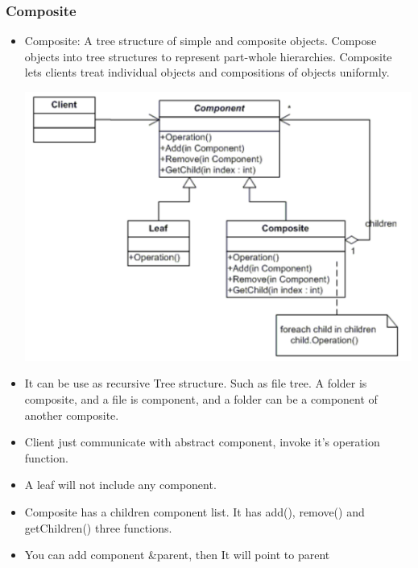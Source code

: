 \documentclass[a4paper,12pt,twoside]{book}
\begin{document}
\subsubsection{Composite}
\begin{itemize}
\item Composite: A tree structure of simple and composite objects. Compose objects into tree structures to represent part-whole hierarchies. Composite lets clients treat individual objects and compositions of objects uniformly.

\includegraphics[scale=0.69]{pics/composite.png}

\item It can be use as recursive Tree structure. Such as file tree. A folder is composite, and a file is component, and a folder can be a component of another composite. 

\item Client just communicate with abstract component, invoke it's operation function. 

\item A leaf will not include any component. 

\item Composite has a children component list. It has add(), remove() and getChildren() three functions. 

\item You can add component \&parent, then It will point to parent 
\end{itemize}
\end{document}
